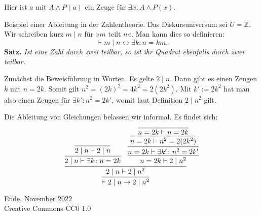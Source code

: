 \documentclass[8pt]{beamer}
\newcommand{\modest}[1]{{\small\color{gray}#1}}
\newcommand{\strong}[1]{\textsf{\textbf{#1}}}
\newcommand{\parspace}{\vspace{0.8em}}
\newcommand{\cond}{\rightarrow}
\newcommand{\bicond}{\leftrightarrow}
\newcommand{\Z}{\mathbb Z}
\begin{document}
\begin{frame}[t]
{\parspace
Hier ist $a$ mit $A\land P(a)$ ein Zeuge für $\exists x\colon A\land P(x)$.
}
\end{frame}

\begin{frame}
Beispiel einer Ableitung in der Zahlentheorie.
Das Diskursuniversum sei $U=\Z$. Wir schreiben kurz $m\mid n$
für »$m$ teilt $n$«. Man kann dies so definieren:
\[\vdash m\mid n\bicond\exists k\colon n=km.\]\pause
\strong{Satz.} \emph{Ist eine Zahl durch zwei teilbar, so
ist ihr Quadrat ebenfalls durch zwei teilbar.}\pause

\parspace
Zunächst die Beweisführung in Worten.
Es gelte $2\mid n$. Dann gibt es einen Zeugen $k$ mit $n=2k$.
Somit gilt $n^2 = (2k)^2 = 4k^2 = 2(2k^2)$. Mit $k':=2k^2$ hat
man also einen Zeugen für $\exists k'\colon n^2=2k'$, womit
laut Definition $2\mid n^2$ gilt.\pause

\parspace
Die Ableitung von Gleichungen belassen wir informal.
Es findet sich:
\[
\infer{\vdash 2\mid n \cond 2\mid n^2}{
  \infer{2\mid n\vdash 2\mid n^2}{
    \infer{2\mid n\vdash\exists k\colon n=2k}{
      \infer{2\mid n\vdash 2\mid n}{}}
  & \infer{n=2k\vdash 2\mid n^2}{
      \infer{n=2k\vdash\exists k'\colon n^2=2k'}{
        \infer{n=2k\vdash n^2 = 2(2k^2)}{
          \infer{n=2k\vdash n=2k}{}}}}}}
\]
\end{frame}

\begin{frame}
Ende.
\vfill\hfill\modest{November 2022}\\
\hfill\modest{Creative Commons CC0 1.0}
\end{frame}
\end{document}

